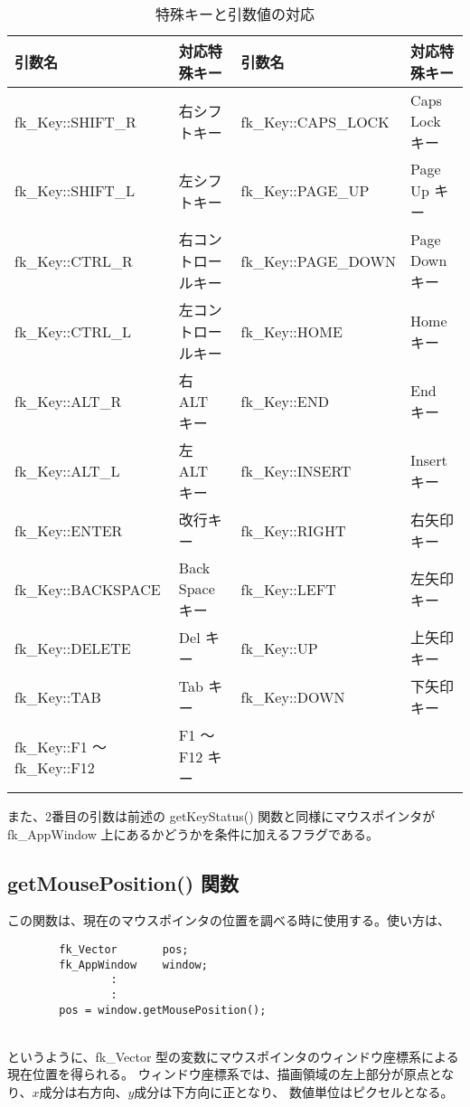 \begin{table}[H]
\caption{特殊キーと引数値の対応}
\label{tbl:fkSpecialKey}
\begin{center}
\begin{tabular}{|p{}|p{}||p{}|p{}|}
\hline
引数名 & 対応特殊キー & 引数名 & 対応特殊キー \\ \hline \hline
fk\_Key::SHIFT\_R	& 右シフトキー &
fk\_Key::CAPS\_LOCK	& Caps Lock キー \\ \hline
fk\_Key::SHIFT\_L	& 左シフトキー &
fk\_Key::PAGE\_UP	& Page Up キー \\ \hline
fk\_Key::CTRL\_R	& 右コントロールキー &
fk\_Key::PAGE\_DOWN	& Page Down キー \\ \hline
fk\_Key::CTRL\_L	& 左コントロールキー &
fk\_Key::HOME		& Home キー \\ \hline
fk\_Key::ALT\_R		& 右 ALT キー &
fk\_Key::END		& End キー \\ \hline
fk\_Key::ALT\_L		& 左 ALT キー &
fk\_Key::INSERT		& Insert キー \\ \hline
fk\_Key::ENTER		& 改行キー &
fk\_Key::RIGHT		& 右矢印キー \\ \hline
fk\_Key::BACKSPACE	& Back Space キー &
fk\_Key::LEFT		& 左矢印キー \\ \hline
fk\_Key::DELETE		& Del キー &
fk\_Key::UP		& 上矢印キー \\ \hline
fk\_Key::TAB		& Tab キー &
fk\_Key::DOWN		& 下矢印キー \\ \hline
fk\_Key::F1 〜 fk\_Key::F12 & F1 〜 F12 キー & & \\ \hline
\end{tabular}
\end{center}
\end{table}

また、2番目の引数は前述の getKeyStatus() 関数と同様にマウスポインタが
fk\_AppWindow 上にあるかどうかを条件に加えるフラグである。

\subsection{getMousePosition() 関数}
この関数は、現在のマウスポインタの位置を調べる時に使用する。使い方は、
\\
\begin{breakbox}
\begin{verbatim}
        fk_Vector       pos;
        fk_AppWindow    window;
                :
                :
        pos = window.getMousePosition();
\end{verbatim}
\end{breakbox}
~ \\
というように、fk\_Vector 型の変数にマウスポインタのウィンドウ座標系による現在位置を得られる。
ウィンドウ座標系では、描画領域の左上部分が原点となり、\(x\)成分は右方向、\(y\)成分は下方向に正となり、
数値単位はピクセルとなる。

